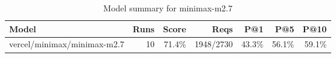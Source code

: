 \begin{table}[htbp]
\centering
\begin{tabular}{lrrrrrr}
\toprule
Model & Runs & Score & Reqs & P@1 & P@5 & P@10 \\
\midrule
vercel/minimax/minimax-m2.7 & 10 & 71.4\% & 1948/2730 & 43.3\% & 56.1\% & 59.1\% \\
\bottomrule
\end{tabular}
\caption{Model summary for minimax-m2.7}
\end{table}

